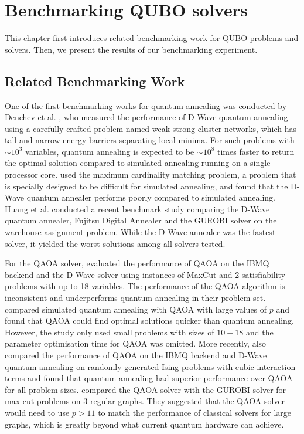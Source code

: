 \chapter{Benchmarking QUBO solvers}\label{benchmark}
This chapter first introduces related benchmarking work for QUBO problems and solvers. Then, we present the results of our benchmarking experiment.

\section{Related Benchmarking Work}
One of the first benchmarking works for quantum annealing was conducted by Denchev et al. , who measured the performance of D-Wave quantum annealing using a carefully crafted problem named weak-strong cluster networks, which has tall and narrow energy barriers separating local minima. For such problems with $\sim 10^3$ variables, quantum annealing is expected to be $\sim 10^8$ times faster to return the optimal solution compared to simulated annealing running on a single processor core.  used the maximum cardinality matching problem, a problem that is specially designed to be difficult for simulated annealing, and found that the D-Wave quantum annealer performs poorly compared to simulated annealing. Huang et al.  conducted a recent benchmark study comparing the D-Wave quantum annealer, Fujitsu Digital Annealer and the GUROBI solver on the warehouse assignment problem. While the D-Wave annealer was the fastest solver, it yielded the worst solutions among all solvers tested.

For the QAOA solver,  evaluated the performance of QAOA on the IBMQ backend and the D-Wave solver using instances of MaxCut and 2-satisfiability problems with up to 18 variables. The performance of the QAOA algorithm is inconsistent and underperforms quantum annealing in their problem set.  compared simulated quantum annealing with QAOA with large values of $p$ and found that QAOA could find optimal solutions quicker than quantum annealing. However, the study only used small problems with sizes of $10-18$ and the parameter optimisation time for QAOA was omitted. More recently,  also compared the performance of QAOA on the IBMQ backend and D-Wave quantum annealing on randomly generated Ising problems with cubic interaction terms and found that quantum annealing had superior performance over QAOA for all problem sizes.  compared the QAOA solver with the GUROBI solver for max-cut problems on 3-regular graphs. They suggested that the QAOA solver would need to use $p > 11$ to match the performance of classical solvers for large graphs, which is greatly beyond what current quantum hardware can achieve.

